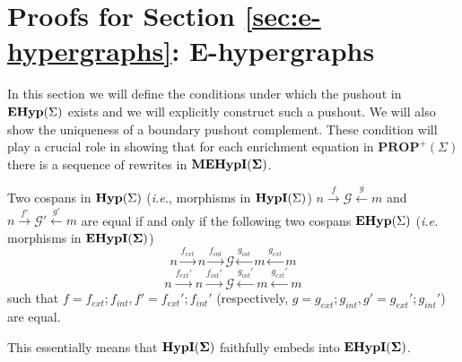 \section{Proofs for Section \ref{sec:e-hypergraphs}: E-hypergraphs}

In this section we will define the conditions under which the pushout in $\mathbf{EHyp}(\Sigma)$ exists and we will explicitly construct such a pushout.
We will also show the uniqueness of a boundary pushout complement.
These condition will play a crucial role in showing that for each enrichment equation in $\textbf{PROP}^{+}(\Sigma)$ there is a sequence of rewrites in ${\mathbf{MEHypI(\Sigma)}}$.

\begin{proposition}
    Two cospans in $\mathbf{Hyp}(\Sigma)$ (\textit{i.e.}, morphisms in $\textbf{HypI}(\Sigma)$) $n \xrightarrow{f} \mathcal{G} \xleftarrow{g} m$ and $n \xrightarrow{f'} \mathcal{G}' \xleftarrow{g'} m$ are equal if and only if
    the following two cospans  $\mathbf{EHyp}(\Sigma)$ (\textit{i.e.} morphisms in ${\mathbf{EHypI(\Sigma)}}$)
    \[
    n \xrightarrow{f_{ext}} n \xrightarrow{f_{int}} \mathcal{G} \xleftarrow{g_{int}} m \xleftarrow{g_{ext}} m
    \]
    \[
        n \xrightarrow{f_{ext}'} n \xrightarrow{f_{int}'} \mathcal{G} \xleftarrow{g_{int}'} m \xleftarrow{g_{ext}'} m    
    \]
    such that $f = f_{ext};f_{int}, f'=f_{ext}';f_{int}'$ (respectively, $g = g_{ext};g_{int}, g' = g_{ext}';g_{int}'$) are equal.
\end{proposition}
This essentially means that $\mathbf{\textbf{HypI}(\Sigma)}$ faithfully embeds into ${\mathbf{EHypI(\Sigma)}}$. 
